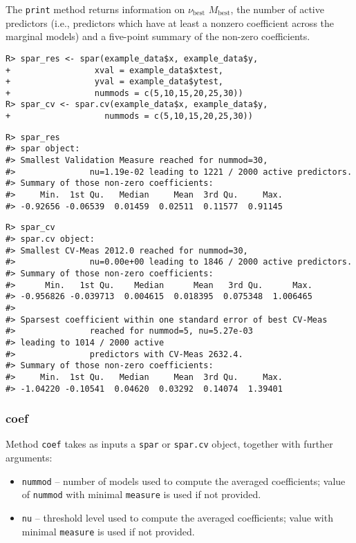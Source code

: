 \documentclass[
  article]{jss}
\begin{document}
The \texttt{print} method returns information on \(\nu_\text{best}\)
\(M_\text{best}\), the number of active predictors (i.e., predictors
which have at least a nonzero coefficient across the marginal models)
and a five-point summary of the non-zero coefficients.

\begin{verbatim}
R> spar_res <- spar(example_data$x, example_data$y,
+                 xval = example_data$xtest,
+                 yval = example_data$ytest,
+                 nummods = c(5,10,15,20,25,30))
R> spar_cv <- spar.cv(example_data$x, example_data$y,
+                   nummods = c(5,10,15,20,25,30))
\end{verbatim}

\begin{verbatim}
R> spar_res
#> spar object:
#> Smallest Validation Measure reached for nummod=30,
#>               nu=1.19e-02 leading to 1221 / 2000 active predictors.
#> Summary of those non-zero coefficients:
#>     Min.  1st Qu.   Median     Mean  3rd Qu.     Max. 
#> -0.92656 -0.06539  0.01459  0.02511  0.11577  0.91145
\end{verbatim}

\begin{verbatim}
R> spar_cv
#> spar.cv object:
#> Smallest CV-Meas 2012.0 reached for nummod=30,
#>               nu=0.00e+00 leading to 1846 / 2000 active predictors.
#> Summary of those non-zero coefficients:
#>      Min.   1st Qu.    Median      Mean   3rd Qu.      Max. 
#> -0.956826 -0.039713  0.004615  0.018395  0.075348  1.006465 
#> 
#> Sparsest coefficient within one standard error of best CV-Meas
#>               reached for nummod=5, nu=5.27e-03 
#> leading to 1014 / 2000 active
#>               predictors with CV-Meas 2632.4.
#> Summary of those non-zero coefficients:
#>     Min.  1st Qu.   Median     Mean  3rd Qu.     Max. 
#> -1.04220 -0.10541  0.04620  0.03292  0.14074  1.39401
\end{verbatim}

\subsubsection{coef}\label{coef}

Method \texttt{coef} takes as inputs a \texttt{spar} or \texttt{spar.cv}
object, together with further arguments:

\begin{itemize}
\item
  \texttt{nummod} -- number of models used to compute the averaged
  coefficients; value of \texttt{nummod} with minimal \texttt{measure}
  is used if not provided.
\item
  \texttt{nu} -- threshold level used to compute the averaged
  coefficients; value with minimal \texttt{measure} is used if not
  provided.
\end{itemize}
\end{document}
